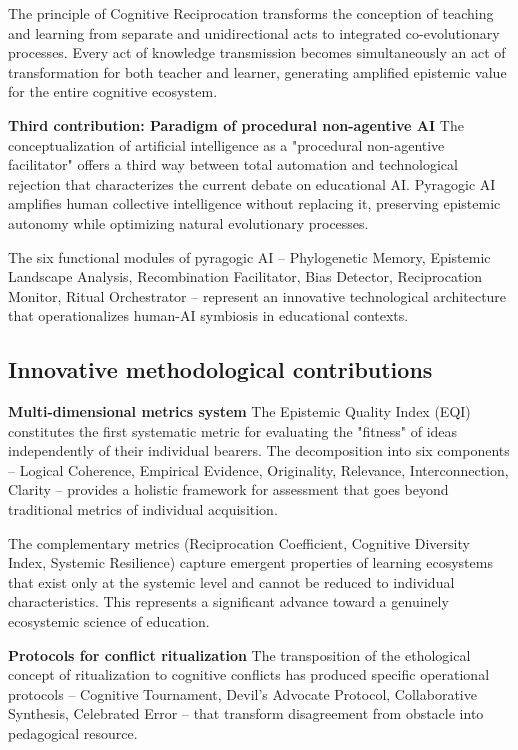 The principle of Cognitive Reciprocation transforms the conception of teaching and learning from separate and unidirectional acts to integrated co-evolutionary processes. Every act of knowledge transmission becomes simultaneously an act of transformation for both teacher and learner, generating amplified epistemic value for the entire cognitive ecosystem.

\textbf{Third contribution: Paradigm of procedural non-agentive AI}
The conceptualization of artificial intelligence as a "procedural non-agentive facilitator" offers a third way between total automation and technological rejection that characterizes the current debate on educational AI. Pyragogic AI amplifies human collective intelligence without replacing it, preserving epistemic autonomy while optimizing natural evolutionary processes.

The six functional modules of pyragogic AI -- Phylogenetic Memory, Epistemic Landscape Analysis, Recombination Facilitator, Bias Detector, Reciprocation Monitor, Ritual Orchestrator -- represent an innovative technological architecture that operationalizes human-AI symbiosis in educational contexts.

\subsection{Innovative methodological contributions}

\textbf{Multi-dimensional metrics system}
The Epistemic Quality Index (EQI) constitutes the first systematic metric for evaluating the "fitness" of ideas independently of their individual bearers. The decomposition into six components -- Logical Coherence, Empirical Evidence, Originality, Relevance, Interconnection, Clarity -- provides a holistic framework for assessment that goes beyond traditional metrics of individual acquisition.

The complementary metrics (Reciprocation Coefficient, Cognitive Diversity Index, Systemic Resilience) capture emergent properties of learning ecosystems that exist only at the systemic level and cannot be reduced to individual characteristics. This represents a significant advance toward a genuinely ecosystemic science of education.

\textbf{Protocols for conflict ritualization}
The transposition of the ethological concept of ritualization to cognitive conflicts has produced specific operational protocols -- Cognitive Tournament, Devil's Advocate Protocol, Collaborative Synthesis, Celebrated Error -- that transform disagreement from obstacle into pedagogical resource.


